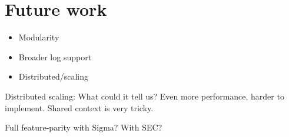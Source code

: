 \section{Future work}
\label{sec:futurework}

\begin{itemize}
    \item Modularity
    \item Broader log support
    \item Distributed/scaling
\end{itemize}

Distributed scaling: What could it tell us? Even more performance, harder to implement. Shared context is very tricky.

Full feature-parity with Sigma? With SEC?